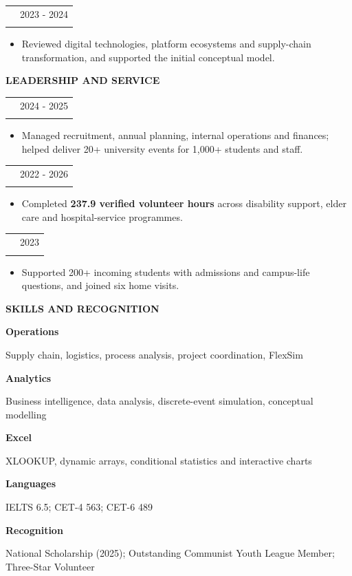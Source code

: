 \documentclass[10pt,a4paper]{article}
\makeatletter
\newcommand{\sectiontitle}[1]{%
  \vspace{5pt}%
  {\color{Navy}\bfseries\fontsize{11.4}{12.8}\selectfont #1}\par
  \vspace{1.2pt}{\color{Rule}\hrule height 0.55pt}\vspace{3pt}%
}
\newcommand{\roleline}[3]{%
  \begin{tabularx}{\textwidth}{@{}>{\raggedright\arraybackslash}X>{\raggedleft\arraybackslash}p{34mm}@{}}
    {\bfseries\color{Navy}#1} & {\fontsize{8.65}{10.2}\selectfont\color{Slate}#3}\\[-0.3pt]
    {\fontsize{8.7}{10.3}\selectfont\color{Slate}#2} &
  \end{tabularx}\vspace{-0.5pt}%
}
\newcommand{\skillrow}[2]{%
  \noindent
  \parbox[t]{23mm}{\strut\bfseries\color{Navy}#1}%
  \hspace{4mm}%
  \parbox[t]{\dimexpr\textwidth-27mm\relax}{\strut#2}%
  \par\vspace{2.2pt}%
}
\makeatother
\begin{document}
\roleline{Digital Technologies and Platforms in Logistics Service Ecosystems}{Research Team Member, University SRTP}{2023 - 2024}
\begin{itemize}
  \item Reviewed digital technologies, platform ecosystems and supply-chain transformation, and supported the initial conceptual model.
\end{itemize}

\sectiontitle{LEADERSHIP AND SERVICE}
\roleline{Vice President, Science and Technology Association}{School of Economics and Management, Southeast University}{2024 - 2025}
\begin{itemize}
  \item Managed recruitment, annual planning, internal operations and finances; helped deliver 20+ university events for 1,000+ students and staff.
\end{itemize}

\roleline{Three-Star Volunteer}{Southeast University}{2022 - 2026}
\begin{itemize}
  \item Completed \textbf{237.9 verified volunteer hours} across disability support, elder care and hospital-service programmes.
\end{itemize}

\roleline{Member, Incoming Student Home-Visit Team}{Southeast University}{2023}
\begin{itemize}
  \item Supported 200+ incoming students with admissions and campus-life questions, and joined six home visits.
\end{itemize}

\sectiontitle{SKILLS AND RECOGNITION}
\skillrow{Operations}{Supply chain, logistics, process analysis, project coordination, FlexSim}
\skillrow{Analytics}{Business intelligence, data analysis, discrete-event simulation, conceptual modelling}
\skillrow{Excel}{XLOOKUP, dynamic arrays, conditional statistics and interactive charts}
\skillrow{Languages}{IELTS 6.5; CET-4 563; CET-6 489}
\skillrow{Recognition}{National Scholarship (2025); Outstanding Communist Youth League Member; Three-Star Volunteer}
\end{document}
